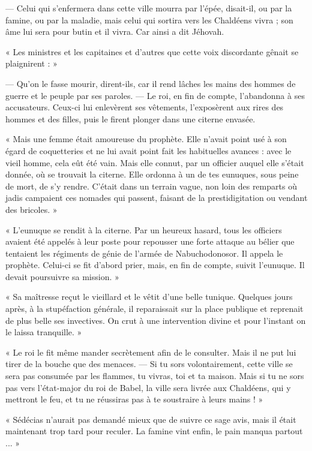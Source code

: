 \documentclass[a4paper, 11pt, oneside, polutonikogreek, french]{article}
\begin{document}
--- Celui qui s'enfermera dans cette ville mourra par l'épée, disait-il, ou par la famine, ou par la maladie, mais celui qui sortira vers les Chaldéens vivra ; son âme lui sera pour butin et il vivra. Car ainsi a dit Jéhovah.

« Les ministres et les capitaines et d'autres que cette voix discordante gênait se plaignirent : »

--- Qu'on le fasse mourir, dirent-ils, car il rend lâches les mains des hommes de guerre et le peuple par ses paroles. --- Le roi, en fin de compte, l'abandonna à ses accusateurs. Ceux-ci lui enlevèrent ses vêtements, l'exposèrent aux rires des hommes et des filles, puis le firent plonger dans une citerne envasée.

« Mais une femme était amoureuse du prophète. Elle n'avait point usé à son égard de coquetteries et ne lui avait point fait les habituelles avances : avec le vieil homme, cela eût été vain. Mais elle connut, par un officier auquel elle s'était donnée, où se trouvait la citerne. Elle ordonna à un de tes eunuques, sous peine de mort, de s'y rendre. C'était dans un terrain vague, non loin des remparts où jadis campaient ces nomades qui passent, faisant de la prestidigitation ou vendant des bricoles. »

« L'eunuque se rendit à la citerne. Par un heureux hasard, tous les officiers avaient été appelés à leur poste pour repousser une forte attaque au bélier que tentaient les régiments de génie de l'armée de Nabuchodonosor. Il appela le prophète. Celui-ci se fit d'abord prier, mais, en fin de compte, suivit l'eunuque. Il devait poursuivre sa mission. »

« Sa maîtresse reçut le vieillard et le vêtit d'une belle tunique. Quelques jours après, à la stupéfaction générale, il reparaissait sur la place publique et reprenait de plus belle ses invectives. On crut à une intervention divine et pour l'instant on le laissa tranquille. »

« Le roi le fit même mander secrètement afin de le consulter. Mais il ne put lui tirer de la bouche que des menaces. --- Si tu sors volontairement, cette ville se sera pas consumée par les flammes, tu vivras, toi et ta maison. Mais si tu ne sors pas vers l'état-major du roi de Babel, la ville sera livrée aux Chaldéens, qui y mettront le feu, et tu ne réussiras pas à te soustraire à leurs mains ! »

« Sédécias n'aurait pas demandé mieux que de suivre ce sage avis, mais il était maintenant trop tard pour reculer. La famine vint enfin, le pain manqua partout ... »
\end{document}
